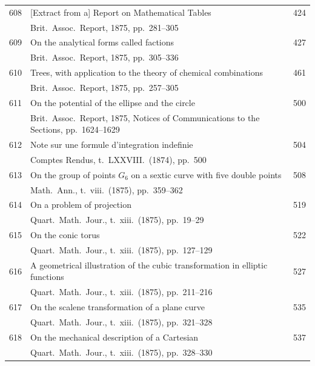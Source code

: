 \documentclass[12pt,a4paper]{article}
\theoremstyle{plain}
\theoremstyle{definition}
\begin{document}
\begin{longtable}{r @{. } p{4.8in} r}
608 & [Extract from a] Report on Mathematical Tables & 424 \\
  & Brit.\ Assoc.\ Report, 1875, pp.\ 281--305 & \\ 

609 & On the analytical forms called factions & 427 \\
  & Brit.\ Assoc.\ Report, 1875, pp.\ 305--336 & \\ 

610 & Trees, with application to the theory of chemical combinations & 461 \\
  & Brit.\ Assoc.\ Report, 1875, pp.\ 257--305 & \\ 

611 & On the potential of the ellipse and the circle & 500 \\
  & Brit.\ Assoc.\ Report, 1875, Notices of Communications to the Sections, pp.\ 1624--1629 & \\ 

612 & Note sur une formule d'integration indefinie & 504 \\
  & Comptes Rendus, t.\ LXXVIII.\ (1874), pp.\ 500 & \\ 

613 & On the group of points $G_6$ on a sextic curve with five double points & 508 \\
  & Math.\ Ann., t.\ viii.\ (1875), pp.\ 359--362 & \\ 

614 & On a problem of projection & 519 \\
  & Quart.\ Math.\ Jour., t.\ xiii.\ (1875), pp.\ 19--29 & \\ 

615 & On the conic torus & 522 \\
  & Quart.\ Math.\ Jour., t.\ xiii.\ (1875), pp.\ 127--129 & \\ 

616 & A geometrical illustration of the cubic transformation in elliptic functions & 527 \\
  & Quart.\ Math.\ Jour., t.\ xiii.\ (1875), pp.\ 211--216 & \\ 

617 & On the scalene transformation of a plane curve & 535 \\
  & Quart.\ Math.\ Jour., t.\ xiii.\ (1875), pp.\ 321--328 & \\ 

618 & On the mechanical description of a Cartesian & 537 \\
  & Quart.\ Math.\ Jour., t.\ xiii.\ (1875), pp.\ 328--330 & \\ 


\end{longtable}
\end{document}
